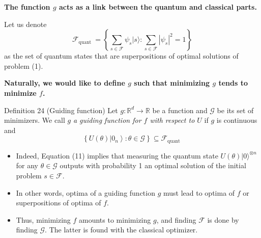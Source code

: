 \textbf{The function $g$ acts as a link between the quantum and classical parts. }


Let us denote 
$$
\mathcal{F}_{\text {quant }}=\left\{\sum_{s \in \mathcal{F}} \psi_{s}|s\rangle: \sum_{s \in \mathcal{F}}\left|\psi_{s}\right|^{2}=1\right\}
$$
as the set of quantum states that are superpositions of optimal solutions of problem (1). %

\textbf{Naturally, we would like to define $g$ such that minimizing $g$ tends to minimize $f$.}

\begin{definition}
    Definition 24 (Guiding function) Let $g: \mathbb{R}^{d} \rightarrow \mathbb{R}$ be a function and $\mathcal{G}$ be its set of minimizers. We call $g$ \textit{a guiding function for $f$ with respect to $U$} if $g$ is continuous and
\begin{equation*}
\left\{U(\theta)\left|0_{n}\right\rangle: \theta \in \mathcal{G}\right\} \subseteq \mathcal{F}_{\text {quant }} \tag{11}
\end{equation*}
\end{definition}

\begin{itemize}
    \item Indeed, Equation (11) implies that measuring the quantum state $U\left(\theta\right)|0\rangle^{\otimes n}$ for any $\theta\in \mathcal{G}$ outputs with probability 1 an optimal solution of the initial problem $s \in \mathcal{F}$.
    \item In other words, optima of a guiding function $g$ must lead to optima of $f$ or superpositions of optima of $f$.
    \item Thus, minimizing $f$ amounts to minimizing $g$, and finding $\mathcal{F}$ is done by finding $\mathcal{G}$. The latter is found with the classical optimizer.
\end{itemize}





